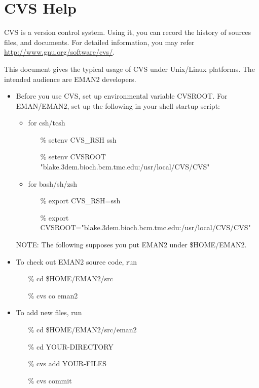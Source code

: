 \section{CVS Help} \label{CVS-HELP} 
CVS is a version control system. Using it, you can record the history of sources files, and documents. For detailed information, you may refer \href{http://www.gnu.org/software/cvs/}{http://www.gnu.org/software/cvs/}.

This document gives the typical usage of CVS under Unix/Linux
platforms. The intended audience are EMAN2 developers.

\begin{itemize}
  \item Before you use CVS, set up environmental variable CVSROOT. For
  EMAN/EMAN2, set up the following in your shell startup script:
  \begin{itemize}
    \item for csh/tcsh
      \begin{itemize} 
	\item[\%] setenv CVS\_RSH ssh
	\item[\%] setenv CVSROOT
	"blake.3dem.bioch.bcm.tmc.edu:/usr/local/CVS/CVS"
      \end{itemize}
    \item for bash/sh/zsh
      \begin{itemize} 
	\item[\%] export CVS\_RSH=ssh
	\item[\%] export
	CVSROOT="blake.3dem.bioch.bcm.tmc.edu:/usr/local/CVS/CVS"
      \end{itemize}
  \end{itemize}
  NOTE: The following supposes you put EMAN2 under \$HOME/EMAN2.

  \item  To check out EMAN2 source code, run
    \begin{itemize} 
        \item[\%] cd \$HOME/EMAN2/src
        \item[\%] cvs co eman2
    \end{itemize}
  \item To add new files, run
    \begin{itemize} 
      \item[\%] cd \$HOME/EMAN2/src/eman2
      \item[\%] cd YOUR-DIRECTORY
      \item[\%] cvs add YOUR-FILES
      \item[\%] cvs commit
    \end{itemize}
	

\end{itemize}
